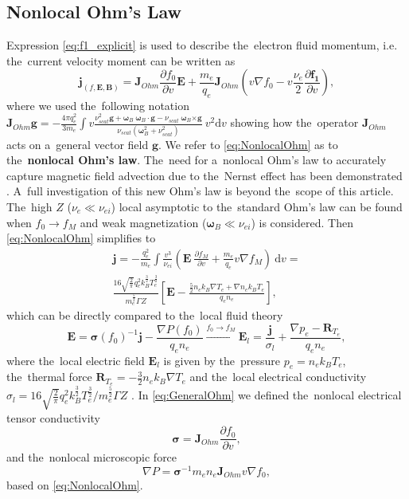 \documentclass[
 aps,
 jmp,
 amsmath,amssymb,
 twocolumn,
]{revtex4-1}
\newcommand{\pdv}[2]{\frac{\partial{#1}}{\partial{#2}}}
\newcommand{\vect}[1]{\boldsymbol{#1}}
\newcommand{\matr}[1]{\mathbf{#1}}
\newcommand{\dI}{\text{d}}
\newcommand{\Zbar}{Z}
\newcommand{\nue}{\nu_{e}}
\newcommand{\nuei}{\nu_{ei}}
\newcommand{\nuscat}{\nu_{scat}}
\newcommand{\vmag}{v}
\newcommand{\E}{\vect{E}}
\newcommand{\B}{\vect{B}}
\newcommand{\omegaB}{\vect{\omega}_{B}}
\newcommand{\qe}{q_e}
\newcommand{\me}{m_e}
\newcommand{\Te}{T_e}
\newcommand{\ed}{n_e}
\newcommand{\kB}{k_B}
\newcommand{\fM}{f_M}
\newcommand{\fzero}{f_0}
\newcommand{\fone}{{\vect{f_1}}}
\newcommand{\Iohm}{\matr{J}_{Ohm}}
\begin{document}
\subsection{Nonlocal Ohm's Law}
\label{sec:Efield}
Expression \eqref{eq:f1_explicit} is used
to describe the~electron fluid momentum, i.e. the~current velocity moment
can be written as
\begin{equation}
  \vect{j}_{(f, \E, \B)} = \Iohm\pdv{\fzero}{\vmag}\E 
  + \frac{\me}{\qe} \Iohm\left(\vmag \nabla \fzero 
  - \vmag\frac{\nue}{2}\pdv{\fone}{\vmag} \right)  
  ,
  \label{eq:NonlocalOhm}
\end{equation}
where we used the~following notation 
$\Iohm\vect{g} = - \frac{4\pi \qe^2}{3 \me} \int \vmag \frac{\nuscat^2 \vect{g} 
  + \omegaB~\omegaB\cdot\vect{g} - \nuscat~\omegaB \vect{\times} \vect{g}}
  {\nuscat (\omegaB^2 + \nuscat^2)}~\vmag^2 \dI \vmag$ showing 
how the~operator $\Iohm$
acts on a~general vector field $\vect{g}$.
We refer to 
\eqref{eq:NonlocalOhm} as to the~{\bf nonlocal Ohm's law}.
The~need for a~nonlocal Ohm's law to accurately capture magnetic field 
advection due to the~Nernst effect has been demonstrated 
\cite{Luciani85, Ridgers08, Brodrick18}. A~full investigation 
of this new Ohm's law is beyond the~scope of this article. 
The~high $\Zbar$ ($\nue \ll \nuei$) local asymptotic to 
the~standard Ohm's law  
can be found when $\fzero\rightarrow\fM$ and weak magnetization 
($\omegaB \ll \nuei$) is considered. Then \eqref{eq:NonlocalOhm} simplifies to
\begin{multline}
  \vect{j} =- \frac{\qe^2}{\me} \int \frac{\vmag^3}{\nuei}
  \left( \E~\pdv{\fM}{\vmag} + \frac{\me}{\qe}\vmag \nabla \fM \right)
  ~\dI \vmag =\\
  \frac{16\sqrt{\frac{2}{\pi}}\qe^2 \kB^\frac{3}{2} \Te^\frac{3}{2}}{\me^\frac{5}{2} \Gamma\Zbar}
  \left[\E - \frac{\frac{5}{2} \ed \kB \nabla \Te 
  + \nabla \ed \kB \Te}{\qe \ed}  \right] 
  ,
  \label{eq:AsymptoticOhm}
\end{multline}
which can be directly compared to the~local fluid theory  
\begin{equation}
  \E = \matr{\sigma}(\fzero)^{-1} \vect{j} 
  - \frac{\nabla P (\fzero)}{\qe \ed}
  \xrightarrow{\fzero \rightarrow \fM}
  \E_{l} = \frac{\vect{j}}{\sigma_{l}}
  + \frac{\nabla p_e - \vect{R}_{\Te}}{\qe \ed} 
  ,
  \label{eq:GeneralOhm} 
\end{equation}
where the~local electric field $\E_{l}$ is given by
the~pressure $p_e = \ed \kB \Te$,
the~thermal force $\vect{R}_{\Te} = - \frac{3}{2} \ed \kB \nabla \Te$ 
and the~local electrical conductivity 
$\sigma_{l} = 16\sqrt{\frac{2}{\pi}}\qe^2 \kB^\frac{3}{2} \Te^\frac{3}{2}
/ \me^\frac{5}{2} \Gamma\Zbar$ \cite{Braginskii_1965_3}.
In \eqref{eq:GeneralOhm} we defined the~nonlocal electrical tensor conductivity 
\begin{equation}
  \matr{\sigma} = \Iohm\pdv{\fzero}{\vmag}
  ,
  \label{eq:NonlocalSigma}
\end{equation}
and the~nonlocal microscopic force
\begin{equation}
  \nabla P = \matr{\sigma}^{-1}\me\ed \Iohm\vmag \nabla \fzero
  ,
  \label{eq:NonlocalGradP}
\end{equation}
based on \eqref{eq:NonlocalOhm}.
\end{document}
